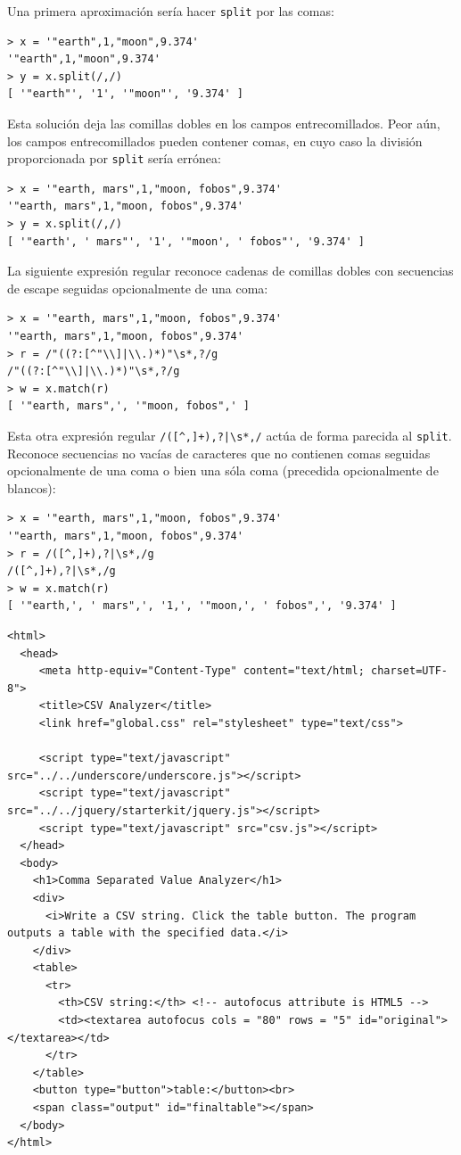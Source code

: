 Una primera aproximación sería hacer \verb|split| por las comas:
\begin{verbatim}
> x = '"earth",1,"moon",9.374'
'"earth",1,"moon",9.374'
> y = x.split(/,/)
[ '"earth"', '1', '"moon"', '9.374' ]
\end{verbatim}

Esta solución deja las comillas dobles en los campos entrecomillados. 
Peor aún, los campos entrecomillados pueden contener comas, en cuyo 
caso la división proporcionada por \verb|split| sería errónea:
\begin{verbatim}
> x = '"earth, mars",1,"moon, fobos",9.374'
'"earth, mars",1,"moon, fobos",9.374'
> y = x.split(/,/)
[ '"earth', ' mars"', '1', '"moon', ' fobos"', '9.374' ]
\end{verbatim}

La siguiente expresión regular reconoce cadenas de comillas dobles
con secuencias de escape seguidas opcionalmente de una coma:
\begin{verbatim}
> x = '"earth, mars",1,"moon, fobos",9.374'
'"earth, mars",1,"moon, fobos",9.374'
> r = /"((?:[^"\\]|\\.)*)"\s*,?/g
/"((?:[^"\\]|\\.)*)"\s*,?/g
> w = x.match(r)
[ '"earth, mars",', '"moon, fobos",' ]
\end{verbatim}

Esta otra expresión regular \verb#/([^,]+),?|\s*,/# actúa de forma parecida al \verb|split|. 
Reconoce secuencias no vacías de caracteres que no contienen comas seguidas opcionalmente
de una coma o bien una sóla coma (precedida opcionalmente de blancos):
\begin{verbatim}
> x = '"earth, mars",1,"moon, fobos",9.374'
'"earth, mars",1,"moon, fobos",9.374'
> r = /([^,]+),?|\s*,/g
/([^,]+),?|\s*,/g
> w = x.match(r)
[ '"earth,', ' mars",', '1,', '"moon,', ' fobos",', '9.374' ]
\end{verbatim}

\begin{verbatim}
<html>
  <head>
     <meta http-equiv="Content-Type" content="text/html; charset=UTF-8">
     <title>CSV Analyzer</title>
     <link href="global.css" rel="stylesheet" type="text/css">

     <script type="text/javascript" src="../../underscore/underscore.js"></script>
     <script type="text/javascript" src="../../jquery/starterkit/jquery.js"></script>
     <script type="text/javascript" src="csv.js"></script>
  </head>
  <body>
    <h1>Comma Separated Value Analyzer</h1>
    <div>
      <i>Write a CSV string. Click the table button. The program outputs a table with the specified data.</i>
    </div>
    <table>
      <tr>
        <th>CSV string:</th> <!-- autofocus attribute is HTML5 -->
        <td><textarea autofocus cols = "80" rows = "5" id="original"></textarea></td> 
      </tr>
    </table>
    <button type="button">table:</button><br>
    <span class="output" id="finaltable"></span>
  </body>
</html>
\end{verbatim}

